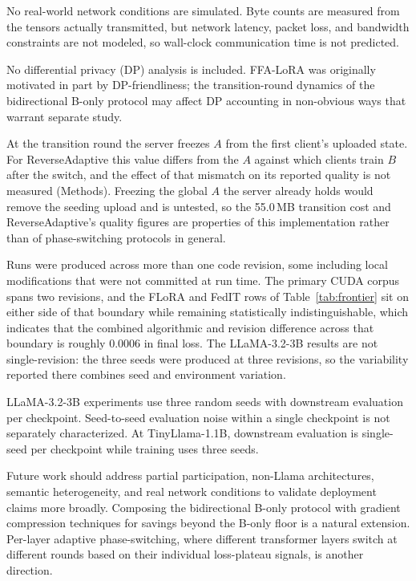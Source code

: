 \documentclass[pdflatex,sn-nature,lineno]{sn-jnl}
\begin{document}
No real-world network conditions are simulated. Byte counts are measured from the tensors actually transmitted, but network latency, packet loss, and bandwidth constraints are not modeled, so wall-clock communication time is not predicted.

No differential privacy (DP) analysis is included. FFA-LoRA \cite{sun2024ffalora} was originally motivated in part by DP-friendliness; the transition-round dynamics of the bidirectional B-only protocol may affect DP accounting in non-obvious ways that warrant separate study.

At the transition round the server freezes $A$ from the first client's uploaded state. For ReverseAdaptive this value differs from the $A$ against which clients train $B$ after the switch, and the effect of that mismatch on its reported quality is not measured (Methods). Freezing the global $A$ the server already holds would remove the seeding upload and is untested, so the 55.0\,MB transition cost and ReverseAdaptive's quality figures are properties of this implementation rather than of phase-switching protocols in general.

Runs were produced across more than one code revision, some including local modifications that were not committed at run time. The primary CUDA corpus spans two revisions, and the FLoRA and FedIT rows of Table~\ref{tab:frontier} sit on either side of that boundary while remaining statistically indistinguishable, which indicates that the combined algorithmic and revision difference across that boundary is roughly 0.0006 in final loss. The LLaMA-3.2-3B results are not single-revision: the three seeds were produced at three revisions, so the variability reported there combines seed and environment variation.

LLaMA-3.2-3B experiments use three random seeds with downstream evaluation per checkpoint. Seed-to-seed evaluation noise within a single checkpoint is not separately characterized. At TinyLlama-1.1B, downstream evaluation is single-seed per checkpoint while training uses three seeds.

Future work should address partial participation, non-Llama architectures, semantic heterogeneity, and real network conditions to validate deployment claims more broadly. Composing the bidirectional B-only protocol with gradient compression techniques \cite{alistarh2017qsgd,lin2017deep} for savings beyond the B-only floor is a natural extension. Per-layer adaptive phase-switching, where different transformer layers switch at different rounds based on their individual loss-plateau signals, is another direction.
\end{document}
